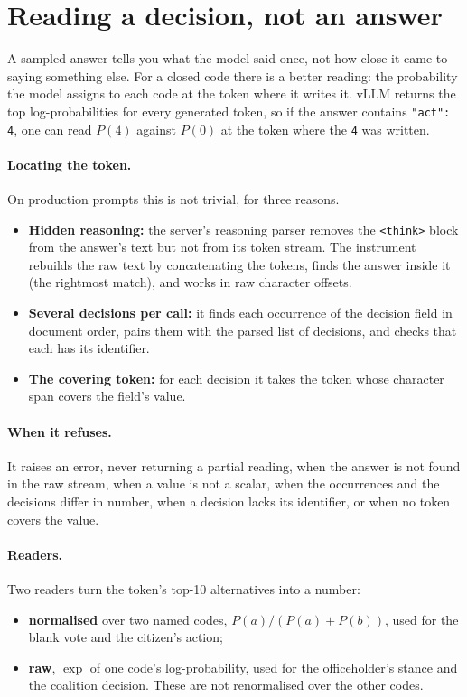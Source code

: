 \documentclass[11pt]{article}
\newcommand{\code}[1]{\texttt{#1}}
\begin{document}
\section{Reading a decision, not an answer}
\label{sec:instrument}

A sampled answer tells you what the model said once, not how close it came to saying something
else. For a closed code there is a better reading: the probability the model assigns to each code
at the token where it writes it. vLLM returns the top log-probabilities for every generated token,
so if the answer contains \code{"act": 4}, one can read $P(4)$ against $P(0)$ at the token where the
\code{4} was written.

\paragraph{Locating the token.} On production prompts this is not trivial, for three reasons.
\begin{itemize}
  \item \textbf{Hidden reasoning:} the server's reasoning parser removes the
    \code{<think>} block from the answer's text but not from its token stream. The instrument
    rebuilds the raw text by concatenating the tokens, finds the answer inside it (the rightmost
    match), and works in raw character offsets.
  \item \textbf{Several decisions per call:} it finds each occurrence of the decision field in
    document order, pairs them with the parsed list of decisions, and checks that each has its
    identifier.
  \item \textbf{The covering token:} for each decision it takes the token whose character span
    covers the field's value.
\end{itemize}

\paragraph{When it refuses.} It raises an error, never returning a partial reading, when the
answer is not found in the raw stream, when a value is not a scalar, when the occurrences and the
decisions differ in number, when a decision lacks its identifier, or when no token covers the
value.

\paragraph{Readers.} Two readers turn the token's top-10 alternatives into a number:
\begin{itemize}
  \item \textbf{normalised} over two named codes, $P(a)/(P(a)+P(b))$, used for the blank vote and
    the citizen's action;
  \item \textbf{raw}, $\exp$ of one code's log-probability, used for the officeholder's stance
    and the coalition decision. These are not renormalised over the other codes.
\end{itemize}
\end{document}
